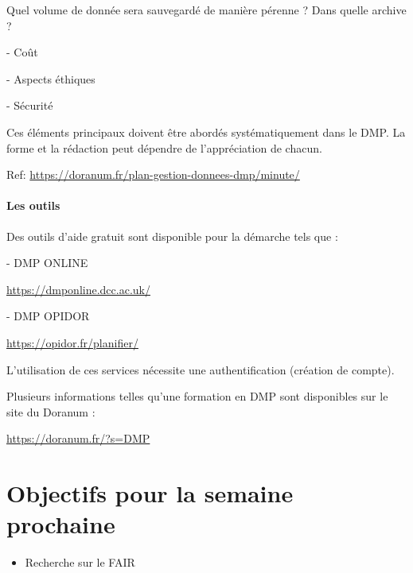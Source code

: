 \documentclass[14pt,oneside]{article}
\begin{document}
\begin{flushleft}
Quel volume de donnée sera sauvegardé de manière pérenne ? Dans quelle archive ?
\end{flushleft}

-	Coût

-	Aspects éthiques

-	Sécurité

\begin{flushleft}
Ces éléments principaux doivent être abordés systématiquement dans le DMP. La forme et la rédaction peut dépendre de l’appréciation de chacun.
\end{flushleft}


\begin{flushleft}
Ref: \url{https://doranum.fr/plan-gestion-donnees-dmp/minute/}
\end{flushleft}

\subsection*{Les outils}

\begin{flushleft}
Des outils d’aide gratuit sont disponible pour la démarche tels que :
\end{flushleft}

-	DMP ONLINE

\begin{flushleft}
\url{https://dmponline.dcc.ac.uk/}
\end{flushleft}

-	DMP OPIDOR

\begin{flushleft}
\url{https://opidor.fr/planifier/}
\end{flushleft}

\begin{flushleft}
L’utilisation de ces services nécessite une authentification (création de compte).
\end{flushleft}

\begin{flushleft}
Plusieurs informations telles qu’une formation en DMP sont disponibles sur le site du Doranum :
\end{flushleft}

\begin{flushleft}
\url{https://doranum.fr/?s=DMP}
\end{flushleft}

\newpage
\part*{Objectifs pour la semaine prochaine}
\begin{itemize}
	\item Recherche sur le FAIR
\end{itemize}
\end{document}
